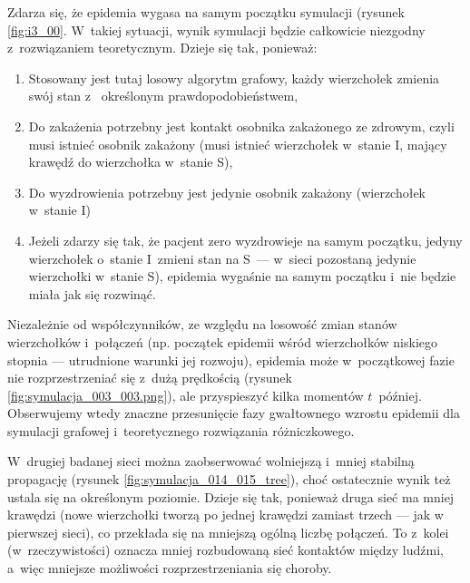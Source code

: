 \begin{enumerate}
Zdarza się, że epidemia wygasa na samym początku symulacji  (rysunek \ref{fig:i3_00}. W~takiej sytuacji, wynik symulacji będzie całkowicie niezgodny z~rozwiązaniem teoretycznym. Dzieje się tak, ponieważ:
\begin{enumerate}[label=\arabic*), nolistsep]
\item Stosowany jest tutaj losowy algorytm grafowy, każdy wierzchołek zmienia swój stan z
~określonym prawdopodobieństwem, 
\item Do zakażenia potrzebny jest kontakt osobnika zakażonego ze zdrowym, czyli musi istnieć osobnik zakażony (musi istnieć wierzchołek w~stanie I, mający krawędź do wierzchołka w~stanie S),
\item Do wyzdrowienia potrzebny jest jedynie osobnik zakażony (wierzchołek w~stanie I)
\item Jeżeli zdarzy się tak, że pacjent zero wyzdrowieje na samym początku, jedyny wierzchołek o~stanie I~zmieni stan na S~--- w~sieci pozostaną jedynie wierzchołki w~stanie S), epidemia wygaśnie na samym początku i~nie będzie miała jak się rozwinąć. 
\end{enumerate}
\par
Niezależnie od współczynników, ze względu na losowość zmian stanów wierzchołków i~połączeń (np. początek epidemii wśród wierzchołków niskiego stopnia --- utrudnione warunki jej rozwoju), epidemia może w~początkowej fazie nie rozprzestrzeniać się z~dużą prędkością (rysunek \ref{fig:symulacja_003_003.png}), ale przyspieszyć kilka momentów $t$~później. Obserwujemy wtedy znaczne przesunięcie fazy gwałtownego wzrostu epidemii dla symulacji grafowej i~teoretycznego rozwiązania różniczkowego.
\par
W~drugiej badanej sieci można zaobserwować wolniejszą i~mniej stabilną propagację (rysunek \ref{fig:symulacja_014_015_tree}), choć ostatecznie wynik też ustala się na określonym poziomie. Dzieje się tak, ponieważ druga sieć ma mniej krawędzi (nowe wierzchołki tworzą po jednej krawędzi zamiast trzech --- jak w~ pierwszej sieci), co przekłada się na mniejszą ogólną liczbę połączeń. To z~kolei (w~rzeczywistości) oznacza mniej rozbudowaną sieć kontaktów między ludźmi, a~więc mniejsze możliwości rozprzestrzeniania się choroby. 



\end{enumerate}

\clearpage


